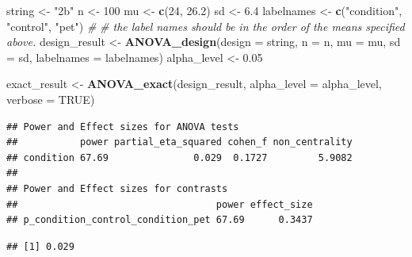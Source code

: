 \documentclass[]{book}
\newenvironment{Shaded}{\begin{snugshade}}{\end{snugshade}}
\newcommand{\CommentTok}[1]{\textcolor[rgb]{0.56,0.35,0.01}{\textit{#1}}}
\newcommand{\DataTypeTok}[1]{\textcolor[rgb]{0.13,0.29,0.53}{#1}}
\newcommand{\DecValTok}[1]{\textcolor[rgb]{0.00,0.00,0.81}{#1}}
\newcommand{\FloatTok}[1]{\textcolor[rgb]{0.00,0.00,0.81}{#1}}
\newcommand{\KeywordTok}[1]{\textcolor[rgb]{0.13,0.29,0.53}{\textbf{#1}}}
\newcommand{\NormalTok}[1]{#1}
\newcommand{\OperatorTok}[1]{\textcolor[rgb]{0.81,0.36,0.00}{\textbf{#1}}}
\newcommand{\OtherTok}[1]{\textcolor[rgb]{0.56,0.35,0.01}{#1}}
\newcommand{\StringTok}[1]{\textcolor[rgb]{0.31,0.60,0.02}{#1}}
\begin{document}
\begin{Shaded}
\begin{Highlighting}[]
\NormalTok{string <-}\StringTok{ "2b"}
\NormalTok{n <-}\StringTok{ }\DecValTok{100}
\NormalTok{mu <-}\StringTok{ }\KeywordTok{c}\NormalTok{(}\DecValTok{24}\NormalTok{, }\FloatTok{26.2}\NormalTok{)}
\NormalTok{sd <-}\StringTok{ }\FloatTok{6.4}
\NormalTok{labelnames <-}\StringTok{ }\KeywordTok{c}\NormalTok{(}\StringTok{"condition"}\NormalTok{, }\StringTok{"control"}\NormalTok{, }\StringTok{"pet"}\NormalTok{) }\CommentTok{#}
\CommentTok{# the label names should be in the order of the means specified above.}
\NormalTok{design_result <-}\StringTok{ }\KeywordTok{ANOVA_design}\NormalTok{(}\DataTypeTok{design =}\NormalTok{ string,}
                              \DataTypeTok{n =}\NormalTok{ n,}
                              \DataTypeTok{mu =}\NormalTok{ mu,}
                              \DataTypeTok{sd =}\NormalTok{ sd,}
                              \DataTypeTok{labelnames =}\NormalTok{ labelnames)}
\NormalTok{alpha_level <-}\StringTok{ }\FloatTok{0.05}

\NormalTok{exact_result <-}\StringTok{ }\KeywordTok{ANOVA_exact}\NormalTok{(design_result,}
                            \DataTypeTok{alpha_level =}\NormalTok{ alpha_level,}
                            \DataTypeTok{verbose =} \OtherTok{TRUE}\NormalTok{)}
\end{Highlighting}
\end{Shaded}

\begin{verbatim}
## Power and Effect sizes for ANOVA tests
##           power partial_eta_squared cohen_f non_centrality
## condition 67.69               0.029  0.1727         5.9082
## 
## Power and Effect sizes for contrasts
##                                   power effect_size
## p_condition_control_condition_pet 67.69      0.3437
\end{verbatim}

\begin{Shaded}
\end{Shaded}

\begin{verbatim}
## [1] 0.029
\end{verbatim}

\begin{Shaded}
\end{Shaded}
\end{document}
